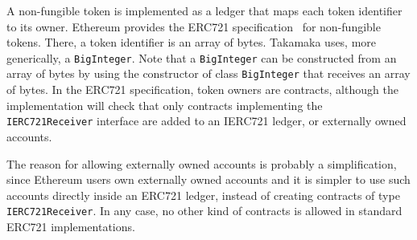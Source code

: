 A non-fungible token is implemented as a ledger that maps each token identifier to its owner.
Ethereum provides the ERC721 specification~\cite{EntrikenSES18} for non-fungible tokens.
There, a token identifier is an array of bytes. Takamaka uses, more generically,
a \texttt{BigInteger}. Note that a \texttt{BigInteger} can be constructed from an array of bytes
by using the constructor of class \texttt{BigInteger} that receives an array of bytes.
In the ERC721 specification, token owners are contracts, although the implementation will check
that only contracts implementing the
\texttt{IERC721Receiver} interface are added
to an IERC721 ledger, or externally owned accounts.
%
\begin{commentbox}
The reason for allowing externally owned accounts is probably a simplification,
since Ethereum users own externally owned accounts and it is simpler
to use such accounts directly inside an ERC721 ledger, instead of creating
contracts of type \texttt{IERC721Receiver}. In any case, no other kind of contracts
is allowed in standard ERC721 implementations.
\end{commentbox}

